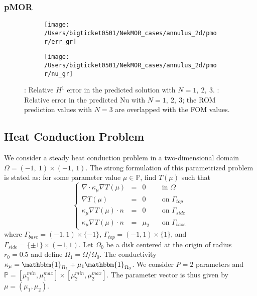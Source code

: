 \subsubsection{pMOR}
\begin{figure}[!h]
     \centering
     \begin{subfigure}[b]{0.45\textwidth}
         \centering
         \texttt{[image: /Users/bigticket0501/NekMOR\_cases/annulus\_2d/pmor/err\_gr]}
         \caption{}
         \label{fig:3_a}
     \end{subfigure}
     \hfill
     \begin{subfigure}[b]{0.45\textwidth}
         \centering
         \texttt{[image: /Users/bigticket0501/NekMOR\_cases/annulus\_2d/pmor/nu\_gr]}
         \caption{}
         \label{fig:3_b}
     \end{subfigure}
     \caption{: Relative $H^1$ error in the predicted solution
     with $N=1,~2,~3$.  : Relative error in the predicted Nu
     with $N=1,~2,~3$; the ROM prediction values with $N=3$ are overlapped with
     the FOM values.} \label{fig:3}
\end{figure}

\newpage
\subsection{Heat Conduction Problem}
We consider a steady heat conduction problem in a two-dimensional domain
$\Omega = (-1,~1)\times(-1,~1)$. 
The strong formulation of this parametrized problem is stated as: for some
parameter value $\mu \in \mathbb{P}$, find $T(\mu)$ such that
%
\begin{equation*}
   \left\{
\begin{array}{llll}
   \nabla \cdot \kappa_\mu \nabla T(\mu) & = & 0 \quad & \text{in } \Omega\\
    \nabla T(\mu)                        & = & 0 \quad & \text{on } \Gamma_{top}\\
    \kappa_\mu \nabla T(\mu) \cdot n     & = & 0 \quad & \text{on } \Gamma_{side}\\
    \kappa_\mu \nabla T(\mu) \cdot n     & = & \mu_2 \quad & \text{on } \Gamma_{base}
\end{array}
\right.
\end{equation*}
%
where $\Gamma_{base} = (-1, 1)\times \{-1\}$, $\Gamma_{top} = (-1, 1)\times
\{1\}$, and $\Gamma_{side} = \{\pm 1\} \times (-1, 1)$.
Let $\Omega_0$ be a disk centered at the origin of radius $r_0=0.5$ and define
$\Omega_1 = \Omega \slash \overline{\Omega}_0$. The conductivity $\kappa_\mu =
\mathbbm{1}_{\Omega_1} + \mu_1 \mathbbm{1}_{\Omega_0}$. We consider $P=2$
parameters and $\mathbb{P} = [ \mu^{min}_1, \mu^{max}_1] \times [\mu^{min}_2,
\mu^{max}_2]$. The parameter vector is thus given by $\mu= (\mu_1, \mu_2)$.


